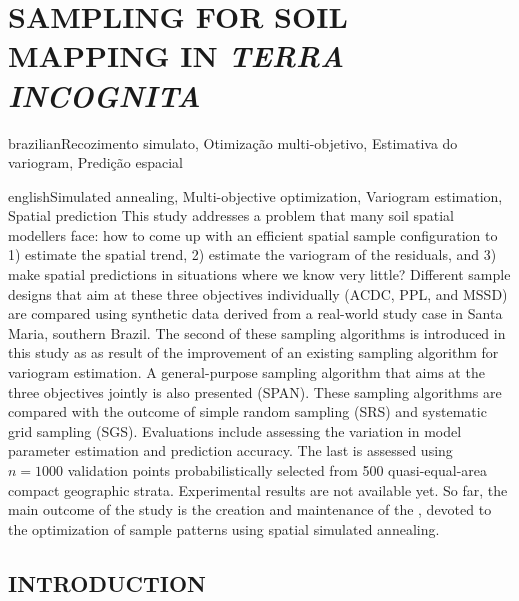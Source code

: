 \artigotrue
\chapter{SAMPLING FOR SOIL MAPPING IN \emph{TERRA INCOGNITA}}
\label{chap:chap08}

\def\ptkeys{Recozimento simulato, Otimização multi-objetivo, Estimativa do variogram, Predição espacial}

\begin{chapterabstract}{brazilian}{\ptkeys}

\end{chapterabstract}

\def\enkeys{Simulated annealing, Multi-objective optimization, Variogram estimation, Spatial prediction}
  
\begin{chapterabstract}{english}{\enkeys}
This study addresses a problem that many soil spatial modellers face: how to come up with an efficient spatial 
sample configuration to 1) estimate the spatial trend, 2) estimate the variogram of the residuals, and 3) make 
spatial predictions in situations where we know very little? Different sample designs that aim at these three
objectives individually (ACDC, PPL, and MSSD) are compared using synthetic data derived from a real-world 
study case in Santa Maria, southern Brazil. The second of these sampling algorithms is introduced in this 
study as as result of the improvement of an existing sampling algorithm for variogram estimation. A 
general-purpose sampling algorithm that aims at the three objectives jointly is also presented (SPAN). These 
sampling algorithms are compared with the outcome of simple random sampling (SRS) and systematic grid sampling 
(SGS). Evaluations include assessing the variation in model parameter estimation and prediction accuracy. The 
last is assessed using $n = 1000$ validation points probabilistically selected from 500 quasi-equal-area 
compact geographic strata. Experimental results are not available yet. So far, the main outcome of the study 
is the creation and maintenance of the , devoted to the optimization of sample patterns using 
spatial simulated annealing.
\end{chapterabstract}

\formatchapter

\section{INTRODUCTION}

